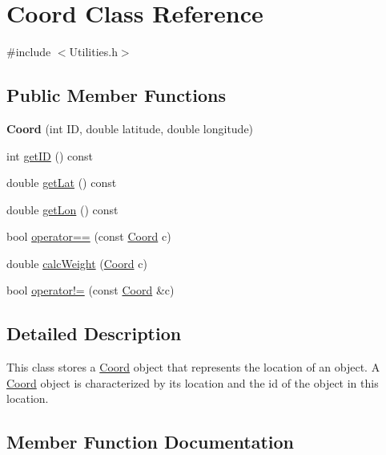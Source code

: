 \hypertarget{class_coord}{}\section{Coord Class Reference}
\label{class_coord}


{\ttfamily \#include $<$Utilities.\+h$>$}

\subsection*{Public Member Functions}
\begin{DoxyCompactItemize}
\item 
{\bfseries Coord} (int ID, double latitude, double longitude)\hypertarget{class_coord_a3b317f4334bb58818eca61c3a304da05}{}\label{class_coord_a3b317f4334bb58818eca61c3a304da05}

\item 
int \hyperlink{class_coord_a8cf61a7d7785441ff858a71a41223199}{get\+ID} () const 
\item 
double \hyperlink{class_coord_a3a09f3ebf7eb46714d51b9063c079f98}{get\+Lat} () const 
\item 
double \hyperlink{class_coord_aa2760a939b4bc5d58b198e4c563eb731}{get\+Lon} () const 
\item 
bool \hyperlink{class_coord_a4d6b3d3dad65a0e8a9e78823ff50e03b}{operator==} (const \hyperlink{class_coord}{Coord} c)
\item 
double \hyperlink{class_coord_a2bdb34b9edbd09b917c7c1a9d723eaa4}{calc\+Weight} (\hyperlink{class_coord}{Coord} c)
\item 
bool \hyperlink{class_coord_a8834b7c3420de8c3dada2517abdd023c}{operator!=} (const \hyperlink{class_coord}{Coord} \&c)
\end{DoxyCompactItemize}


\subsection{Detailed Description}
This class stores a \hyperlink{class_coord}{Coord} object that represents the location of an object. A \hyperlink{class_coord}{Coord} object is characterized by its location and the id of the object in this location. 

\subsection{Member Function Documentation}
